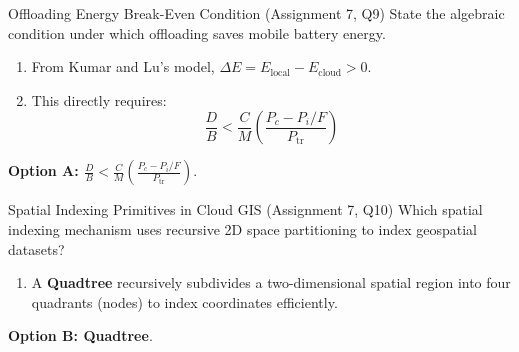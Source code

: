 \begin{solved}{Offloading Energy Break-Even Condition (Assignment 7, Q9)}
\Given State the algebraic condition under which offloading saves mobile battery energy.
\Steps
\begin{enumerate}[leftmargin=*]
  \item From Kumar and Lu's model, $\Delta E = E_{\text{local}} - E_{\text{cloud}} > 0$.
  \item This directly requires:
  \begin{equation}
  \frac{D}{B} < \frac{C}{M} \left( \frac{P_c - P_i/F}{P_{\text{tr}}} \right)
  \end{equation}
\end{enumerate}
\Answer \textbf{Option A: $\frac{D}{B} < \frac{C}{M} \left( \frac{P_c - P_i/F}{P_{\text{tr}}} \right)$}.
\end{solved}

\begin{solved}{Spatial Indexing Primitives in Cloud GIS (Assignment 7, Q10)}
\Given Which spatial indexing mechanism uses recursive 2D space partitioning to index geospatial datasets?
\Steps
\begin{enumerate}[leftmargin=*]
  \item A \textbf{Quadtree} recursively subdivides a two-dimensional spatial region into four quadrants (nodes) to index coordinates efficiently.
\end{enumerate}
\Answer \textbf{Option B: Quadtree}.
\end{solved}
